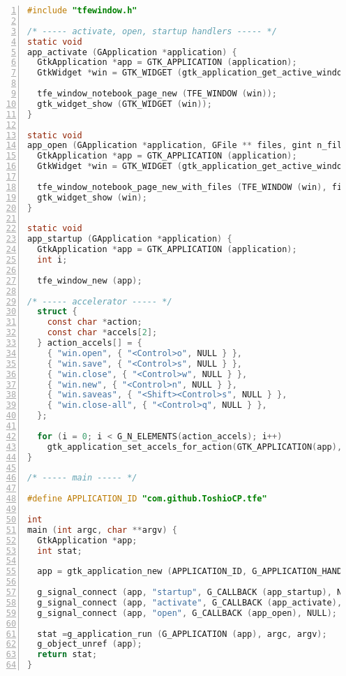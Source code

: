 \begin{lstlisting}[language=C, numbers=left]
#include "tfewindow.h"

/* ----- activate, open, startup handlers ----- */
static void
app_activate (GApplication *application) {
  GtkApplication *app = GTK_APPLICATION (application);
  GtkWidget *win = GTK_WIDGET (gtk_application_get_active_window (app));

  tfe_window_notebook_page_new (TFE_WINDOW (win));
  gtk_widget_show (GTK_WIDGET (win));
}

static void
app_open (GApplication *application, GFile ** files, gint n_files, const gchar *hint) {
  GtkApplication *app = GTK_APPLICATION (application);
  GtkWidget *win = GTK_WIDGET (gtk_application_get_active_window (app));

  tfe_window_notebook_page_new_with_files (TFE_WINDOW (win), files, n_files);
  gtk_widget_show (win);
}

static void
app_startup (GApplication *application) {
  GtkApplication *app = GTK_APPLICATION (application);
  int i;

  tfe_window_new (app);

/* ----- accelerator ----- */ 
  struct {
    const char *action;
    const char *accels[2];
  } action_accels[] = {
    { "win.open", { "<Control>o", NULL } },
    { "win.save", { "<Control>s", NULL } },
    { "win.close", { "<Control>w", NULL } },
    { "win.new", { "<Control>n", NULL } },
    { "win.saveas", { "<Shift><Control>s", NULL } },
    { "win.close-all", { "<Control>q", NULL } },
  };

  for (i = 0; i < G_N_ELEMENTS(action_accels); i++)
    gtk_application_set_accels_for_action(GTK_APPLICATION(app), action_accels[i].action, action_accels[i].accels);
}

/* ----- main ----- */

#define APPLICATION_ID "com.github.ToshioCP.tfe"

int
main (int argc, char **argv) {
  GtkApplication *app;
  int stat;

  app = gtk_application_new (APPLICATION_ID, G_APPLICATION_HANDLES_OPEN);

  g_signal_connect (app, "startup", G_CALLBACK (app_startup), NULL);
  g_signal_connect (app, "activate", G_CALLBACK (app_activate), NULL);
  g_signal_connect (app, "open", G_CALLBACK (app_open), NULL);

  stat =g_application_run (G_APPLICATION (app), argc, argv);
  g_object_unref (app);
  return stat;
}
\end{lstlisting}

